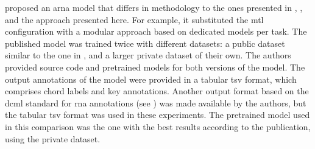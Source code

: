 
\textcite{mcleod2021modular} proposed an \gls{arna} model
that differs in methodology to the ones presented in
\textcite{chen2021attend}, \textcite{micchi2021deep}, and
the approach presented here. For example, it substituted the
\gls{mtl} configuration with a modular approach based on
dedicated models per task. The published model was trained
twice with different datasets: a public dataset similar to
the one in \textcite{micchi2021deep}, and a larger private
dataset of their own. The authors provided source code and
pretrained models for both versions of the model. The output
annotations of the model were provided in a tabular \gls{tsv}
format, which comprises chord labels and key annotations.
Another output format based on the \gls{dcml} standard for
\gls{rna} annotations (see )
was made available by the authors, but the tabular \gls{tsv}
format was used in these experiments. The pretrained model
used in this comparison was the one with the best results
according to the publication, using the private dataset.

